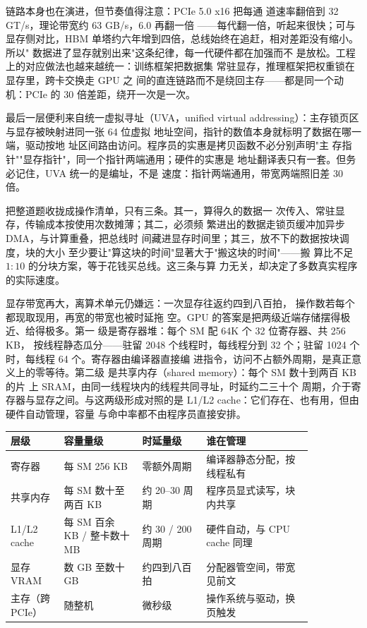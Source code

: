 链路本身也在演进，但节奏值得注意：PCIe 5.0 x16 把每通
道速率翻倍到 32 GT/s，理论带宽约 63 GB/s，6.0 再翻一倍
——每代翻一倍，听起来很快；可与显存侧对比，HBM 单塔约六年增到四倍，总线始终在追赶，相对差距没有缩小。所以"
数据进了显存就别出来"这条纪律，每一代硬件都在加强而不
是放松。工程上的对应做法也越来越统一：训练框架把数据集
常驻显存，推理框架把权重锁在显存里，跨卡交换走 GPU 之
间的直连链路而不是绕回主存——都是同一个动机：PCIe 的
30 倍差距，绕开一次是一次。

最后一层便利来自统一虚拟寻址（UVA，unified virtual
addressing）：主存锁页区与显存被映射进同一张 64 位虚拟
地址空间，指针的数值本身就标明了数据在哪一端，驱动按地
址区间路由访问。程序员的实惠是拷贝函数不必分别声明"主
存指针""显存指针"，同一个指针两端通用；硬件的实惠是
地址翻译表只有一套。但务必记住，UVA 统一的是编址，不是
速度：指针两端通用，带宽两端照旧差 30 倍。

把整道题收拢成操作清单，只有三条。其一，算得久的数据一
次传入、常驻显存，传输成本按使用次数摊薄；其二，必须频
繁进出的数据走锁页缓冲加异步 DMA，与计算重叠，把总线时
间藏进显存时间里；其三，放不下的数据按块调度，块的大小
至少要让"算这块的时间"显著大于"搬这块的时间"——搬
算比不足 $1:10$ 的分块方案，等于花钱买总线。这三条与算
力无关，却决定了多数真实程序的实际速度。

显存带宽再大，离算术单元仍嫌远：一次显存往返约四到八百拍，
操作数若每个都现取现用，再宽的带宽也被时延拖
空。GPU 的答案是把两级近端存储摆得极近、给得极多。第一
级是寄存器堆：每个 SM 配 64K 个 32 位寄存器、共 256 KB，
按线程静态瓜分——驻留 2048 个线程时，每线程分到 32
个；驻留 1024 个时，每线程 64 个。寄存器由编译器直接编
进指令，访问不占额外周期，是真正意义上的零等待。第二级
是共享内存（shared memory）：每个 SM 数十到两百 KB 的片
上 SRAM，由同一线程块内的线程共同寻址，时延约二三十个
周期，介于寄存器与显存之间。与这两级形成对照的是
L1/L2 cache：它们存在、也有用，但由硬件自动管理，容量
与命中率都不由程序员直接安排。

\begin{longtable}{L{0.15\linewidth}L{0.22\linewidth}L{0.18\linewidth}L{0.3\linewidth}}
\toprule
层级 & 容量量级 & 时延量级 & 谁在管理 \\
\midrule
寄存器 & 每 SM 256 KB & 零额外周期 & 编译器静态分配，按线程私有 \\
共享内存 & 每 SM 数十至两百 KB & 约 20--30 周期 & 程序员显式读写，块内共享 \\
L1/L2 cache & 每 SM 百余 KB / 整卡数十 MB & 约 30 / 200 周期 & 硬件自动，与 CPU cache 同理 \\
显存 VRAM & 数 GB 至数十 GB & 约四到八百拍 & 分配器管空间，带宽见前文 \\
主存（跨 PCIe） & 随整机 & 微秒级 & 操作系统与驱动，换页触发 \\
\bottomrule
\end{longtable}


